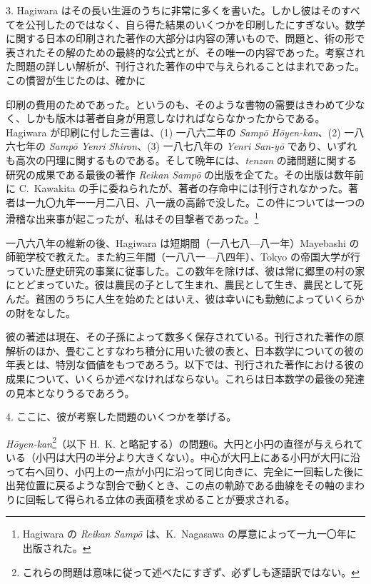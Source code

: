 \documentclass[11pt]{article}
\newcommand{\scanpage}[2]{\clearpage\setcounter{footnote}{0}\noindent{\footnotesize\color{gray}PDF #1 頁 · #2}\par\medskip}
\begin{document}
3. Hagiwara はその長い生涯のうちに非常に多くを書いた。しかし彼はそのすべてを公刊したのではなく、自ら得た結果のいくつかを印刷したにすぎない。数学に関する日本の印刷された著作の大部分は内容の薄いもので、問題と、術の形で表されたその解のための最終的な公式とが、その唯一の内容であった。考察された問題の詳しい解析が、刊行された著作の中で与えられることはまれであった。この慣習が生じたのは、確かに

\scanpage{0318}{印刷頁 304 (top left)}
\noindent 印刷の費用のためであった。というのも、そのような書物の需要はきわめて少なく、しかも版木は著者自身が用意しなければならなかったからである。Hagiwara が印刷に付した三書は、(1) 一八六二年の \emph{Sampō Hōyen-kan}、(2) 一八六七年の \emph{Sampō Yenri Shiron}、(3) 一八七八年の \emph{Yenri San-yō} であり、いずれも高次の円理に関するものである。そして晩年には、\emph{tenzan} の諸問題に関する研究の成果である最後の著作 \emph{Reikan Sampō} の出版を企てた。その出版は数年前に C.~Kawakita の手に委ねられたが、著者の存命中には刊行されなかった。著者は一九〇九年一一月二八日、八一歳の高齢で没した。この件については一つの滑稽な出来事が起こったが、私はその目撃者であった。\footnote{Hagiwara の \emph{Reikan Sampō} は、K.~Nagasawa の厚意によって一九一〇年に出版された。}

一八六八年の維新の後、Hagiwara は短期間（一八七八---八一年）Mayebashi の師範学校で教えた。また約三年間（一八八一---八四年）、Tokyo の帝国大学が行っていた歴史研究の事業に従事した。この数年を除けば、彼は常に郷里の村の家にとどまっていた。彼は農民の子として生まれ、農民として生き、農民として死んだ。貧困のうちに人生を始めたとはいえ、彼は幸いにも勤勉によっていくらかの財をなした。

彼の著述は現在、その子孫によって数多く保存されている。刊行された著作の原解析のほか、畳むことすなわち積分に用いた彼の表と、日本数学についての彼の年表とは、特別な価値をもつであろう。以下では、刊行された著作における彼の成果について、いくらか述べなければならない。これらは日本数学の最後の発達の見本となりうるであろう。

4. ここに、彼が考察した問題のいくつかを挙げる。

\emph{Hōyen-kan}\footnote{これらの問題は意味に従って述べたにすぎず、必ずしも逐語訳ではない。}（以下 H.~K. と略記する）の問題6。大円と小円の直径が与えられている（小円は大円の半分より大きくない）。中心が大円上にある小円が大円に沿って右へ回り、小円上の一点が小円に沿って同じ向きに、完全に一回転した後に出発位置に戻るような割合で動くとき、この点の軌跡である曲線をその軸のまわりに回転して得られる立体の表面積を求めることが要求される。
\end{document}
